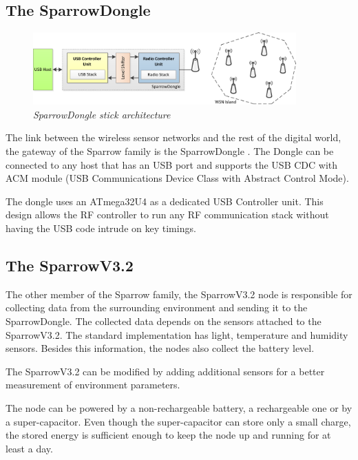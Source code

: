 \subsection{The SparrowDongle}

\begin{figure}[ht]
\begin{center}
\includegraphics[width=0.9\textwidth]{img/donge_architecture.png}
\end{center}
\caption{\small \itshape{SparrowDongle stick architecture}\cite{voinescu2013lightweight}}
\end{figure}
 
The link between the wireless sensor networks and the rest of the digital world, the gateway of the Sparrow family is the SparrowDongle . The Dongle can be connected to any host that has an USB port and supports the USB CDC with ACM module (USB Communications Device Class with Abstract Control Mode). 

The dongle uses an ATmega32U4 as a dedicated USB Controller unit. This design allows the RF controller to run any RF communication stack without having the USB code intrude on key timings.\cite{voinescu2013lightweight}


\subsection{The SparrowV3.2}
 
 
The other member of the Sparrow family, the SparrowV3.2 node is responsible for collecting data from the surrounding environment and sending it to the SparrowDongle. The collected data depends on the sensors attached to the SparrowV3.2. The standard implementation has light, temperature and humidity sensors. Besides this information, the nodes also collect the battery level.

The SparrowV3.2 can be modified by adding additional sensors for a better measurement of environment parameters.

The node can be powered by a non-rechargeable battery, a rechargeable one or by a super-capacitor. Even though the super-capacitor can store only a small charge, the stored energy is sufficient enough to keep the node up and running for at least a day.

